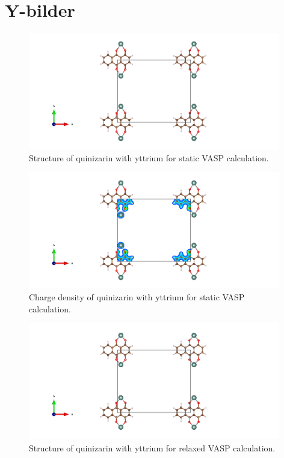 \documentclass{article}
\begin{document}
\vspace{1cm}

\section{Y-bilder}

  \begin{figure}[H]
      \centering
      \includegraphics[width = 11cm]{../fig/Y_staticbefore_CONTCAR.png}
      \caption{Structure of quinizarin with yttrium for static VASP calculation. }
      \label{fig:Y_staticbefore_CONTCAR}
  \end{figure}

  \begin{figure}[H]
      \centering
      \includegraphics[width = 11cm]{../fig/Y_staticbefore_CHGCAR.png}
      \caption{Charge density of quinizarin with yttrium for static VASP calculation. }
      \label{fig:Y_staticbefore_CHGCAR}
  \end{figure}

  \begin{figure}[H]
      \centering
      \includegraphics[width = 11cm]{../fig/Y_relax_CONTCAR.png}
      \caption{Structure of quinizarin with yttrium for relaxed VASP calculation. }
      \label{fig:Y_relax_CONTCAR}
  \end{figure}
\end{document}
